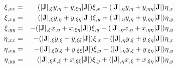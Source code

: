 %
\begin{eqnarray}
\xi_{,xx} & = &   \;\; ( |{\bf J}|_{,\xi} y_{,\eta} + y_{,\xi\eta} |{\bf J}| ) \xi_{,x} + 
                   ( |{\bf J}|_{,\eta} y_{,\eta} + y_{,\eta\eta} |{\bf J}| )  \eta_{,x} \\
\xi_{,xy} & = &   \;\; ( |{\bf J}|_{,\xi} y_{,\eta} + y_{,\xi\eta} |{\bf J}| ) \xi_{,y} + 
                   ( |{\bf J}|_{,\eta} y_{,\eta} + y_{,\eta\eta} |{\bf J}| ) \eta_{,y} \\
\xi_{,yy} & = &   -( |{\bf J}|_{,\xi} x_{,\eta} + x_{,\xi\eta} |{\bf J}| ) \xi_{,y} - 
               ( |{\bf J}|_{,\eta} x_{,\eta} + x_{,\eta\eta} |{\bf J}| ) \eta_{,y}  \\
\eta_{,xx} & = &  -( |{\bf J}|_{,\xi} y_{,\xi} + y_{,\xi\xi} |{\bf J}| ) \xi_{,x} - 
               ( |{\bf J}|_{,\eta} y_{,\xi} + y_{,\xi\eta} |{\bf J}| ) \eta_{,x} \\
\eta_{,xy} & = &  -( |{\bf J}|_{,\xi} y_{,\xi} + y_{,\xi\xi} |{\bf J}| ) \xi_{,y} - 
               ( |{\bf J}|_{,\eta} y_{,\xi} + y_{,\xi\eta} |{\bf J}| ) \eta_{,y} \\
\eta_{,yy} & = &  \;\; ( |{\bf J}|_{,\xi} x_{,\xi} + x_{,\xi\xi} |{\bf J}| ) \xi_{,y} + 
                   ( |{\bf J}|_{,\eta} x_{,\xi} + x_{,\xi\eta} |{\bf J}| ) \eta_{,y}
\end{eqnarray}

